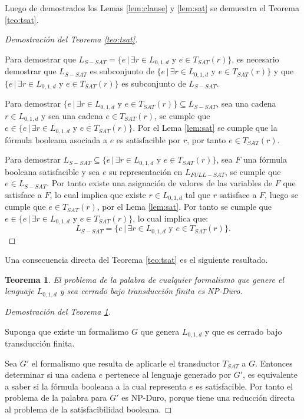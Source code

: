 \documentclass[12pt]{article}
\newtheorem{theorem}{Teorema}
\begin{document}
Luego de demostrados los Lemas \ref{lem:clause} y \ref{lem:sat} se demuestra el Teorema \ref{teo:tsat}.

\begin{proof}[Demostración del Teorema \ref{teo:tsat}] \
    
    Para demostrar que $L_{S-SAT} = \{e\,|\,\exists r \in L_{0,1,d} \text{ y } e \in T_{SAT}(r) \}$, es necesario demostrar que 
    $L_{S-SAT}$ es subconjunto de $\{e\,|\,\exists r \in L_{0,1,d} \text{ y } e \in T_{SAT}(r) \}$ y que $\{e\,|\,\exists r \in L_{0,1,d} \text{ y } e \in T_{SAT}(r) \}$ es subconjunto de $L_{S-SAT}$.
    
    Para demostrar $\{e\,|\,\exists r \in L_{0,1,d} \text{ y } e \in T_{SAT}(r) \} \subseteq L_{S-SAT}$,
    sea una cadena $r \in L_{0,1,d}$ y sea una cadena $e\in T_{SAT}(r)$, se cumple que $e\in\{e\,|\,\exists r \in L_{0,1,d} \text{ y } e \in T_{SAT}(r) \}$. Por el Lema \ref{lem:sat} se cumple que la fórmula booleana asociada a $e$ es satisfacible por $r$, por tanto $e\in T_{SAT}(r)$. 
    
    Para demostrar $ L_{S-SAT} \subseteq \{e\,|\,\exists r \in L_{0,1,d} \text{ y } e \in T_{SAT}(r) \}$, sea $F$ una fórmula booleana satisfacible y sea $e$ su representación en $L_{FULL-SAT}$, se cumple que $e\in L_{S-SAT}$.  Por tanto existe una asignación de valores de las variables de $F$ que satisface a $F$, lo cual implica que existe $r\in L_{0,1,d}$ tal que $r$ satisface a $F$, luego se cumple que $e\in T_{SAT}(r)$, por el Lema \ref{lem:sat}.  Por tanto se cumple que $e\in \{e\,|\,\exists r \in L_{0,1,d} \text{ y } e \in T_{SAT}(r) \}$, lo cual implica que:
    $$L_{S-SAT} = \{e\,|\,\exists r \in L_{0,1,d} \text{ y } e \in T_{SAT}(r) \}.$$
\end{proof}

Una consecuencia directa del Teorema \ref{teo:tsat} es el siguiente resultado. 

\begin{theorem}
    \label{teo:gnp-hard}
    El problema de la palabra de cualquier formalismo que genere el lenguaje $L_{0,1,d}$ y sea cerrado bajo transducción finita es NP-Duro.
\end{theorem}

\begin{proof}[Demostración del Teorema \ref{teo:gnp-hard}] \
    
    Suponga que existe un formalismo $G$ que genera $L_{0,1,d}$ y que es cerrado bajo transducción finita.
    
    Sea $G'$ el formalismo que resulta de aplicarle el transductor $T_{SAT}$ a $G$. Entonces determinar si una cadena $e$ pertenece al lenguaje generado por $G'$, es equivalente a saber si la fórmula booleana a la cual representa $e$ es satisfacible. Por tanto el problema de la palabra para $G'$ es NP-Duro, porque tiene una reducción directa al problema de la satisfacibilidad booleana.
\end{proof}
\end{document}
